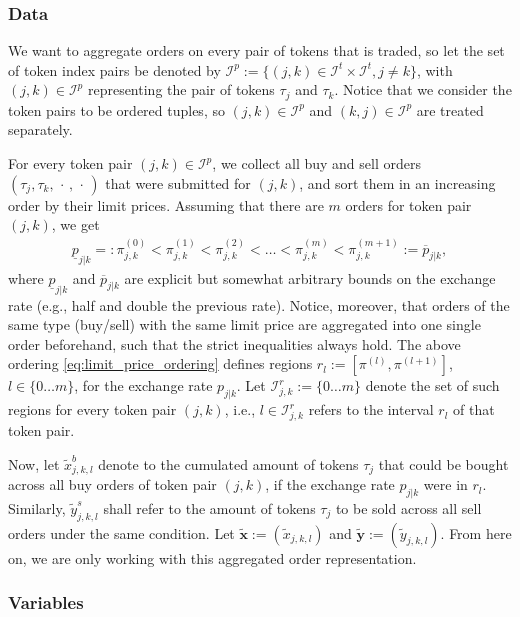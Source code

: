 \documentclass[11pt,parskip=full]{scrartcl}%
\newcommand*{\ie}{i.e., }
\newcommand*{\eg}{e.g., }
\newcommand*{\itokens}{\mathcal{I}^t}       %
\newcommand*{\itokenpairs}{\mathcal{I}^p}   %
\begin{document}
\subsubsection*{Data}

We want to aggregate orders on every pair of tokens that is traded, so let the set of token index
pairs be denoted by $ \itokenpairs := \{(j,k) \in \itokens \times \itokens, j \neq k\} $, with
$ (j,k) \in \itokenpairs $ representing the pair of tokens $ \tau_j $ and $ \tau_k $.
Notice that we consider the token pairs to be ordered tuples, so $ (j,k) \in \itokenpairs $ and
$ (k,j) \in \itokenpairs $ are treated separately.

For every token pair $ (j,k) \in \itokenpairs $, we collect all buy and sell orders
$ (\tau_j,\tau_k,\, \cdot \,,\, \cdot \,) $ that were submitted for $ (j,k) $, and sort them in an
increasing order by their limit prices.
Assuming that there are $ m $ orders for token pair $ (j,k) $, we get
\begin{align}
  \underline{p}_{j|k} =:
    \pi^{(0)}_{j,k} < \pi^{(1)}_{j,k} < \pi^{(2)}_{j,k} <
    \ldots < \pi^{(m)}_{j,k} < \pi^{(m+1)}_{j,k}
  := \overline{p}_{j|k},
  \label{eq:limit_price_ordering}
\end{align}
where $ \underline{p}_{j|k} $ and $ \overline{p}_{j|k} $ are explicit but somewhat arbitrary bounds
on the exchange rate (\eg half and double the previous rate).
Notice, moreover, that orders of the same type (buy/sell) with the same limit price are aggregated
into one single order beforehand, such that the strict inequalities always hold.
The above ordering \eqref{eq:limit_price_ordering} defines regions
$ r_l := [\pi^{(l)},\pi^{(l+1)}] $, $ l \in \{0 \ldots m\} $, for the exchange rate $ p_{j|k} $.
Let $ \mathcal{I}_{j,k}^r := \{0 \ldots m\} $ denote the set of such regions for every token pair
$ (j,k) $, \ie $ l \in \mathcal{I}_{j,k}^r $ refers to the interval $ r_l $ of that token pair.

Now, let $ \tilde{x}_{j,k,l}^b $ denote to the cumulated amount of tokens $ \tau_j $ that could be
bought across all buy orders of token pair $ (j,k) $, if the exchange rate $ p_{j|k} $ were in
$ r_l $.
Similarly, $ \tilde{y}_{j,k,l}^s $ shall refer to the amount of tokens $ \tau_j $ to be sold across
all sell orders under the same condition.
Let $ \tilde{\mathbf{x}} := (\tilde{x}_{j,k,l}) $ and
$ \tilde{\mathbf{y}} := (\tilde{y}_{j,k,l}) $.
From here on, we are only working with this aggregated order representation.


\subsubsection*{Variables}
\end{document}
